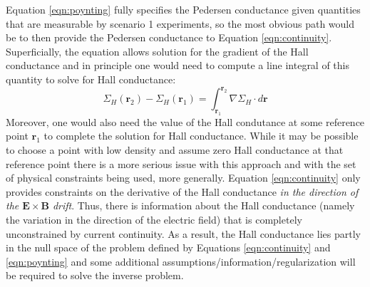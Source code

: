 \documentclass[11pt,letterpaper]{article}
\begin{document}
Equation \ref{eqn:poynting} fully specifies the Pedersen conductance given quantities that are measurable by scenario 1 experiments, so the most obvious path would be to then provide the Pedersen conductance to Equation \ref{eqn:continuity}.  Superficially, the equation allows solution for the gradient of the Hall conductance and in principle one would need to compute a line integral of this quantity to solve for Hall conductance:
\begin{equation}
\Sigma_H(\mathbf{r}_2)-\Sigma_H(\mathbf{r}_1) = \int_{\mathbf{r}_1}^{\mathbf{r}_2} \nabla \Sigma_H \cdot d \mathbf{r}
\end{equation}
Moreover, one would also need the value of the Hall condutance at some reference point $\mathbf{r}_1$ to complete the solution for Hall conductance.  While it may be possible to choose a point with low density and assume zero Hall conductance at that reference point there is a more serious issue with this approach and with the set of physical constraints being used, more generally.  Equation \ref{eqn:continuity} only provides constraints on the derivative of the Hall conductance \emph{in the direction of the $\mathbf{E} \times \mathbf{B}$ drift}.  Thus, there is information about the Hall conductance (namely the variation in the direction of the electric field) that is completely unconstrained by current continuity.  As a result, the Hall conductance lies partly in the null space of the problem defined by Equations \ref{eqn:continuity} and \ref{eqn:poynting} and some additional assumptions/information/regularization will be required to solve the inverse problem.  
\end{document}
